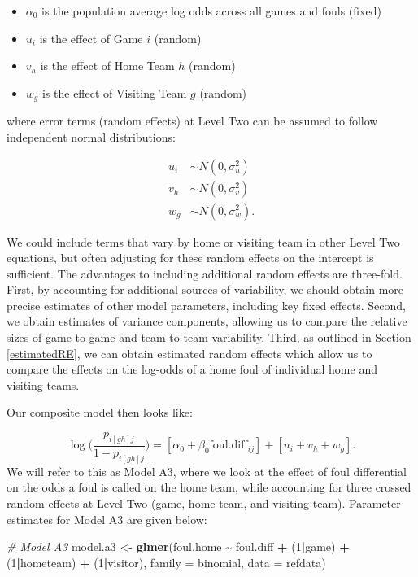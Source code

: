 \documentclass[
]{krantz}
\newenvironment{Shaded}{\begin{snugshade}}{\end{snugshade}}
\newcommand{\AttributeTok}[1]{\textcolor[rgb]{0.27,0.27,0.27}{#1}}
\newcommand{\CommentTok}[1]{\textcolor[rgb]{0.37,0.37,0.37}{\textit{#1}}}
\newcommand{\DecValTok}[1]{\textcolor[rgb]{0.06,0.06,0.06}{#1}}
\newcommand{\FunctionTok}[1]{\textcolor[rgb]{0.27,0.27,0.27}{\textbf{#1}}}
\newcommand{\NormalTok}[1]{#1}
\newcommand{\OtherTok}[1]{\textcolor[rgb]{0.37,0.37,0.37}{#1}}
\newcommand{\SpecialCharTok}[1]{\textcolor[rgb]{0.43,0.43,0.43}{\textbf{#1}}}
\providecommand{\tightlist}{%
  \setlength{\itemsep}{0pt}\setlength{\parskip}{0pt}}
\begin{document}
\begin{itemize}
\tightlist
\item
  \(\alpha_{0}\) is the population average log odds across all games and fouls (fixed)
\item
  \(u_{i}\) is the effect of Game \(i\) (random)
\item
  \(v_{h}\) is the effect of Home Team \(h\) (random)
\item
  \(w_{g}\) is the effect of Visiting Team \(g\) (random)
\end{itemize}

where error terms (random effects) at Level Two can be assumed to follow independent normal distributions:

\begin{align*}
u_{i} & \sim N \left( 0 , \sigma_{u}^{2} \right) \\
v_{h} & \sim N \left( 0 , \sigma_{v}^{2} \right) \\
w_{g} & \sim N \left( 0 , \sigma_{w}^{2} \right).
\end{align*}

We could include terms that vary by home or visiting team in other Level Two equations, but often adjusting for these random effects on the intercept is sufficient. The advantages to including additional random effects are three-fold. First, by accounting for additional sources of variability, we should obtain more precise estimates of other model parameters, including key fixed effects. Second, we obtain estimates of variance components, allowing us to compare the relative sizes of game-to-game and team-to-team variability. Third, as outlined in Section \ref{estimatedRE}, we can obtain estimated random effects which allow us to compare the effects on the log-odds of a home foul of individual home and visiting teams.

Our composite model then looks like:

\begin{equation*}
\log\bigg(\frac{p_{i[gh]j}}{1-p_{i[gh]j}}\bigg) = [\alpha_{0}+\beta_{0}\mathrm{foul.diff}_{ij}]+[u_{i}+v_{h}+w_{g}].
\end{equation*}
We will refer to this as Model A3, where we look at the effect of foul differential on the odds a foul is called on the home team, while accounting for three crossed random effects at Level Two (game, home team, and visiting team). Parameter estimates for Model A3 are given below:

\begin{Shaded}
\begin{Highlighting}[]
\CommentTok{\# Model A3}
\NormalTok{model.a3 }\OtherTok{\textless{}{-}} \FunctionTok{glmer}\NormalTok{(foul.home }\SpecialCharTok{\textasciitilde{}}\NormalTok{ foul.diff }\SpecialCharTok{+}\NormalTok{ (}\DecValTok{1}\SpecialCharTok{|}\NormalTok{game) }\SpecialCharTok{+} 
\NormalTok{    (}\DecValTok{1}\SpecialCharTok{|}\NormalTok{hometeam) }\SpecialCharTok{+}\NormalTok{ (}\DecValTok{1}\SpecialCharTok{|}\NormalTok{visitor), }
    \AttributeTok{family =}\NormalTok{ binomial, }\AttributeTok{data =}\NormalTok{ refdata)}
\end{Highlighting}
\end{Shaded}
\end{document}

